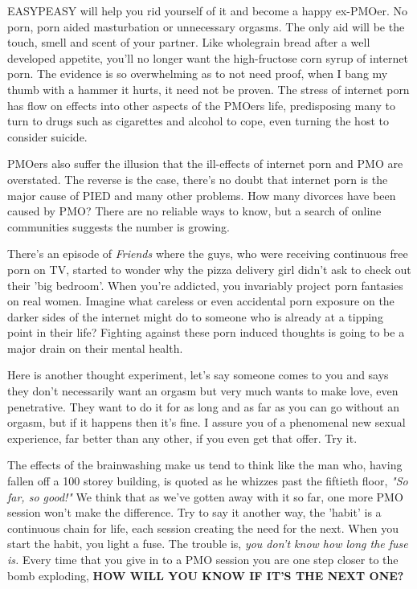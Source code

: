 \documentclass[easypeasy.tex]{subfiles}
\begin{document}
EASYPEASY will help you rid yourself of it and become a happy ex-PMOer. No porn, porn aided masturbation or unnecessary orgasms. The only aid will be the touch, smell and scent of your partner. Like wholegrain bread after a well developed appetite, you'll no longer want the high-fructose corn syrup of internet porn. The evidence is so overwhelming as to not need proof, when I bang my thumb with a hammer it hurts, it need not be proven. The stress of internet porn has flow on effects into other aspects of the PMOers life, predisposing many to turn to drugs such as cigarettes and alcohol to cope, even turning the host to consider suicide.

PMOers also suffer the illusion that the ill-effects of internet porn and PMO are overstated. The reverse is the case, there's no doubt that internet porn is the major cause of PIED and many other problems. How many divorces have been caused by PMO? There are no reliable ways to know, but a search of online communities suggests the number is growing.

There's an episode of \textit{Friends} where the guys, who were receiving continuous free porn on TV, started to wonder why the pizza delivery girl didn't ask to check out their 'big bedroom'. When you're addicted, you invariably project porn fantasies on real women. Imagine what careless or even accidental porn exposure on the darker sides of the internet might do to someone who is already at a tipping point in their life? Fighting against these porn induced thoughts is going to be a major drain on their mental health.

Here is another thought experiment, let's say someone comes to you and says they don't necessarily want an orgasm but very much wants to make love, even penetrative. They want to do it for as long and as far as you can go without an orgasm, but if it happens then it's fine. I assure you of a phenomenal new sexual experience, far better than any other, if you even get that offer. Try it.

The effects of the brainwashing make us tend to think like the man who, having fallen off a 100 storey building, is quoted as he whizzes past the fiftieth floor, \textit{"So far, so good!"} We think that as we've gotten away with it so far, one more PMO session won't make the difference. Try to say it another way, the 'habit' is a continuous chain for life, each session creating the need for the next. When you start the habit, you light a fuse. The trouble is, \textit{you don't know how long the fuse is.} Every time that you give in to a PMO session you are one step closer to the bomb exploding, \textbf{HOW WILL YOU KNOW IF IT'S THE NEXT ONE?}
\end{document}
